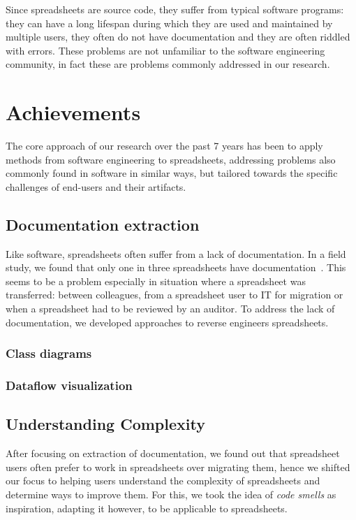 \documentclass[conference]{IEEEtran}
\begin{document}
Since spreadsheets are source code, they suffer from typical software programs: they can have a long lifespan during which they are used and maintained by multiple users, they often do not have documentation and they are often riddled with errors. These problems are not unfamiliar to the software engineering community, in fact these are problems commonly addressed in our research. 



\section{Achievements} 
The core approach of our research over the past 7 years has been to apply methods from software engineering to spreadsheets, addressing problems also commonly found in software in similar ways, but tailored towards the specific challenges of end-users and their artifacts.


\subsection{Documentation extraction} 
Like software, spreadsheets often suffer from a lack of documentation. In a field study, we found that only one in three spreadsheets have documentation~\cite{Hermans2011}. This seems to be a problem especially in situation where a spreadsheet was transferred: between colleagues, from a spreadsheet user to IT for migration or when a spreadsheet had to be reviewed by an auditor. To address the lack of documentation, we developed approaches to reverse engineers spreadsheets.

\subsubsection{Class diagrams}

\subsubsection{Dataflow visualization}

\subsection{Understanding Complexity} 
After focusing on extraction of documentation, we found out that spreadsheet users often prefer to work in spreadsheets over migrating them, hence we shifted our focus to helping users understand the complexity of spreadsheets and determine ways to improve them. For this, we took the idea of \emph{code smells} as inspiration, adapting it however, to be applicable to spreadsheets.
\end{document}
